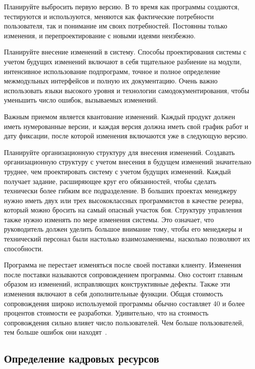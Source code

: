 \documentclass{../industrial-development}
\begin{document}
\lecturenotes

Планируйте выбросить первую версию. В то время как программы создаются, тестируются и используются, меняются как фактические потребности пользователя, так и понимание им своих потребностей. Постоянны только изменения, и перепроектирование с новыми идеями неизбежно.

Планируйте внесение изменений в систему. Способы проектирования системы с учетом будущих изменений включают в себя тщательное разбиение на модули, интенсивное использование подпрограмм, точное и полное определение межмодульных интерфейсов и полную их документацию. Очень важно использовать языки высокого уровня и технологии самодокументирования, чтобы уменьшить число ошибок, вызываемых изменений.

Важным приемом является квантование изменений. Каждый продукт должен иметь нумерованные версии, и каждая версия должна иметь свой график работ и дату фиксации, после которой изменения включаются уже в следующую версию.

Планируйте организационную структуру для внесения изменений. Создавать организационную структуру с учетом внесения в будущем изменений значительно труднее, чем проектировать систему с учетом будущих изменений. Каждый получает задание, расширяющее круг его обязанностей, чтобы сделать технически более гибким все подразделение. В больших проектах менеджеру нужно иметь двух или трех высококлассных программистов в качестве резерва, который можно бросить на самый опасный участок боя. Структуру управления также нужно изменять по мере изменения системы. Это означает, что руководитель должен уделить большое внимание тому, чтобы его менеджеры и технический персонал были настолько взаимозаменяемы, насколько позволяют их способности.

Программа не перестает изменяться после своей поставки клиенту. Изменения после поставки называются сопровождением программы. Оно состоит главным образом из изменений, исправляющих конструктивные дефекты. Также эти изменения включают в себя дополнительные функции. Общая стоимость сопровождения широко используемой программы обычно составляет 40 и более процентов стоимости ее разработки. Удивительно, что на стоимость сопровождения сильно влияет число пользователей. Чем больше пользователей, тем больше ошибок они находят~\cite[с.67--70]{Brooks2000}.

\subsection{Определение кадровых ресурсов}
\end{document}
